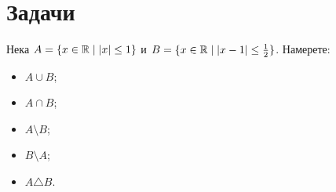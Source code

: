 \section{Задачи}

\begin{problem}
  Нека $A = \{x\in\mathbb{R}\mid |x|\leq 1\}$ и $B = \{x\in\mathbb{R}\mid |x-1|\leq \frac{1}{2}\}$.
  Намерете:
  \begin{itemize}
  \item 
    $A\cup B$;
  \item
    $A\cap B$;
  \item
    $A\setminus B$;
  \item
    $B\setminus A$;
  \item
    $A \triangle B$.
  \end{itemize}
\end{problem}








